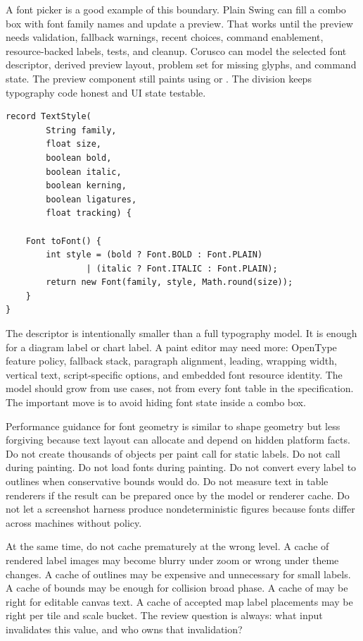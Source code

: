 A font picker is a good example of this boundary. Plain Swing can fill a combo box with font family names and update a preview. That works until the preview needs validation, fallback warnings, recent choices, command enablement, resource-backed labels, tests, and cleanup. Corusco can model the selected font descriptor, derived preview layout, problem set for missing glyphs, and command state. The preview component still paints using  or . The division keeps typography code honest and UI state testable.

\begin{lstlisting}[caption={A model-facing font descriptor instead of raw component state.}]
record TextStyle(
        String family,
        float size,
        boolean bold,
        boolean italic,
        boolean kerning,
        boolean ligatures,
        float tracking) {

    Font toFont() {
        int style = (bold ? Font.BOLD : Font.PLAIN)
                | (italic ? Font.ITALIC : Font.PLAIN);
        return new Font(family, style, Math.round(size));
    }
}
\end{lstlisting}

The descriptor is intentionally smaller than a full typography model. It is enough for a diagram label or chart label. A paint editor may need more: OpenType feature policy, fallback stack, paragraph alignment, leading, wrapping width, vertical text, script-specific options, and embedded font resource identity. The model should grow from use cases, not from every font table in the specification. The important move is to avoid hiding font state inside a combo box.

Performance guidance for font geometry is similar to shape geometry but less forgiving because text layout can allocate and depend on hidden platform facts. Do not create thousands of  objects per paint call for static labels. Do not call  during painting. Do not load fonts during painting. Do not convert every label to outlines when conservative bounds would do. Do not measure text in table renderers if the result can be prepared once by the model or renderer cache. Do not let a screenshot harness produce nondeterministic figures because fonts differ across machines without policy.

At the same time, do not cache prematurely at the wrong level. A cache of rendered label images may become blurry under zoom or wrong under theme changes. A cache of outlines may be expensive and unnecessary for small labels. A cache of  bounds may be enough for collision broad phase. A cache of  may be right for editable canvas text. A cache of accepted map label placements may be right per tile and scale bucket. The review question is always: what input invalidates this value, and who owns that invalidation?

